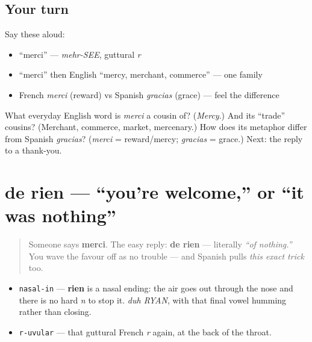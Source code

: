 \subsection*{Your turn}
Say these aloud:

\begin{itemize}
\raggedright
  \item \textquotedblleft{}merci\textquotedblright{} — \emph{mehr-SEE}, guttural \emph{r}
  \item \textquotedblleft{}merci\textquotedblright{} then English \textquotedblleft{}mercy, merchant, commerce\textquotedblright{} — one family
  \item French \emph{merci} (reward) vs Spanish \emph{gracias} (grace) — feel the difference
\end{itemize}

\begin{tcolorbox}[breakable,colback=teal!4,colframe=teal!35!black,title={Before you move on}]
What everyday English word is \emph{merci} a cousin of? (\emph{Mercy}.) And its \textquotedblleft{}trade\textquotedblright{} cousins? (Merchant, commerce, market, mercenary.) How does its metaphor differ from Spanish \emph{gracias}? (\emph{merci} = reward/mercy; \emph{gracias} = grace.) Next: the reply to a thank-you.
\end{tcolorbox}
\section[de rien]{de rien — \textquotedblleft{}you're welcome,\textquotedblright{} or \textquotedblleft{}it was nothing\textquotedblright{}}

\label{lesson:FR-C03-de-rien}



\begin{quote}
Someone says \textbf{merci}. The easy reply: \textbf{de rien} — literally \emph{\textquotedblleft{}of nothing.\textquotedblright{}} You wave the favour off as no trouble — and Spanish pulls \emph{this exact trick} too.
\end{quote}

\begin{sounds}
\begin{itemize}
\raggedright
  \item \texttt{nasal-in} — \textbf{rien} is a nasal ending: the air goes out through the nose and there is no hard \emph{n} to stop it. \emph{duh RYAN}, with that final vowel humming rather than closing.
  \item \texttt{r-uvular} — that guttural French \emph{r} again, at the back of the throat.
\end{itemize}
\end{sounds}

